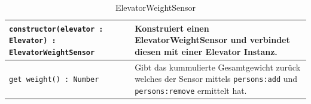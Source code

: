 \begin{table}[htb]
	\begin{tabularx}{0.92\textwidth}{lX}
		\texttt{constructor(elevator : Elevator) : ElevatorWeightSensor} & Konstruiert einen ElevatorWeightSensor und verbindet diesen mit einer Elevator Instanz. \\ \hline
		\texttt{get weight() : Number} & Gibt das kummulierte Gesamtgewicht zurück welches der Sensor mittels \texttt{persons:add} und \texttt{persons:remove} ermittelt hat. \\ \hline
	\end{tabularx}
\caption{ElevatorWeightSensor}
\end{table}
	 
